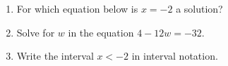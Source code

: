 \documentclass{article}
\begin{document}
\begin{enumerate}
        \begin{enumerate}
        \end{enumerate}



\item For which equation below is $x=-2$ a solution?

        \begin{enumerate}
        \end{enumerate}


\item Solve for $w$ in the equation  \(4-12w=-32 \).

        \begin{enumerate}
        \end{enumerate}


\item Write the interval $x<-2$ in interval notation. 

        \begin{enumerate}
        \end{enumerate}


\end{enumerate}
\end{document}
